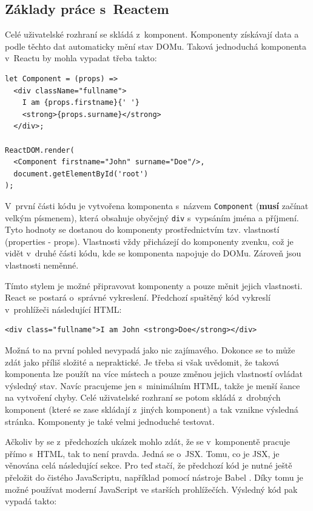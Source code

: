 \subsection{Základy práce s~Reactem}
Celé uživatelské rozhraní se skládá z~komponent. Komponenty získávají data a podle těchto dat automaticky mění stav DOMu. Taková jednoduchá komponenta v~Reactu by mohla vypadat třeba takto:

\begin{verbatim}
let Component = (props) =>
  <div className="fullname">
    I am {props.firstname}{' '}
    <strong>{props.surname}</strong>
  </div>;

ReactDOM.render(
  <Component firstname="John" surname="Doe"/>,
  document.getElementById('root')
);
\end{verbatim}

V~první části kódu je vytvořena komponenta s~názvem \texttt{Component} (\textbf{musí} začínat velkým písmenem), která obsahuje obyčejný \texttt{div} s~vypsáním jména a příjmení. Tyto hodnoty se dostanou do komponenty prostřednictvím tzv. vlastností (properties - props). Vlastnosti vždy přicházejí do komponenty zvenku, což je vidět v~druhé části kódu, kde se komponenta napojuje do DOMu. Zároveň jsou vlastnosti neměnné.

Tímto stylem je možné připravovat komponenty a pouze měnit jejich vlastnosti. React se postará o~správné vykreslení. Předchozí spuštěný kód vykreslí v~prohlížeči následující HTML:

\begin{verbatim}
<div class="fullname">I am John <strong>Doe</strong></div>
\end{verbatim}

Možná to na první pohled nevypadá jako nic zajímavého. Dokonce se to může zdát jako příliš složité a nepraktické. Je třeba si však uvědomit, že taková komponenta lze použít na více místech a pouze změnou jejich vlastností ovládat výsledný stav. Navíc pracujeme jen s~minimálním HTML, takže je menší šance na vytvoření chyby. Celé uživatelské rozhraní se potom skládá z~drobných komponent (které se zase skládají z~jiných komponent) a tak vznikne výsledná stránka. Komponenty je také velmi jednoduché testovat.

Ačkoliv by se z~předchozích ukázek mohlo zdát, že se v~komponentě pracuje přímo s~HTML, tak to není pravda. Jedná se o~JSX. Tomu, co je JSX, je věnována celá následující sekce. Pro teď stačí, že předchozí kód je nutné ještě přeložit do čistého JavaScriptu, například pomocí nástroje Babel \cite{babel}. Díky tomu je možné používat moderní JavaScript ve starších prohlížečích. Výsledný kód pak vypadá takto:

